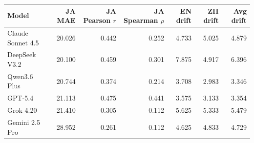 \begin{tabular}{lrrrrrr}
\toprule
Model & JA MAE & JA Pearson $r$ & JA Spearman $\rho$ & EN drift & ZH drift & Avg drift \\
\midrule
Claude Sonnet 4.5 & 20.026 & 0.442 & 0.252 & 4.733 & 5.025 & 4.879 \\
DeepSeek V3.2 & 20.100 & 0.459 & 0.301 & 7.875 & 4.917 & 6.396 \\
Qwen3.6 Plus & 20.744 & 0.374 & 0.214 & 3.708 & 2.983 & 3.346 \\
GPT-5.4 & 21.113 & 0.475 & 0.441 & 3.575 & 3.133 & 3.354 \\
Grok 4.20 & 21.410 & 0.305 & 0.112 & 5.625 & 5.333 & 5.479 \\
Gemini 2.5 Pro & 28.952 & 0.261 & 0.112 & 4.625 & 4.833 & 4.729 \\
\bottomrule
\end{tabular}